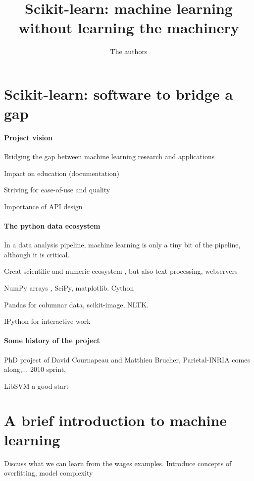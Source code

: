 \documentclass[a4paper]{article}
\title{Scikit-learn: machine learning without learning the machinery}
\author{The authors}
\begin{document}
\maketitle

\section{Scikit-learn: software to bridge a gap}

\paragraph{Project vision}
%
Bridging the gap between machine learning research and applications

\cite{pedregosa2011}

Impact on education (documentation)

Striving for ease-of-use and quality

Importance of API design \cite{buitinck2013ecml}

\paragraph{The python data ecosystem}
%
In a data analysis pipeline, machine learning is only a tiny bit of the
pipeline, although it is critical.

Great scientific and numeric ecosystem
\cite{oliphant2007python,varoquaux2013scipy}, but also text processing,
webservers

NumPy arrays \cite{vanderwalt2011}, SciPy, matplotlib. Cython
\cite{behnel2011cython}

Pandas for columnar data, scikit-image, NLTK.

IPython for interactive work \cite{perez2007ipython}

\paragraph{Some history of the project}
%
PhD project of David Cournapeau and Matthieu Brucher, Parietal-INRIA
comes along,... 2010 sprint, 

LibSVM a good start
\cite{chang2011libsvm}

\section{A brief introduction to machine learning}

Discuss what we can learn from the wages examples. Introduce concepts of
overfitting, model complexity
\end{document}
